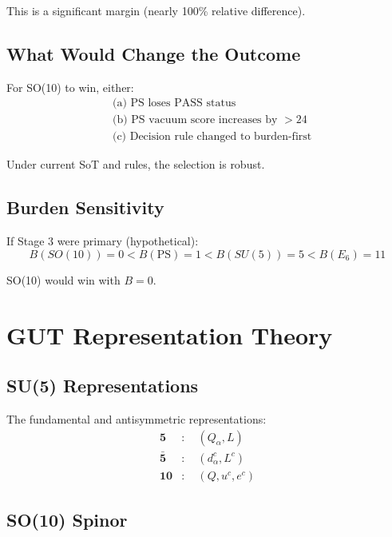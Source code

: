 \documentclass[11pt,a4paper]{article}
\begin{document}
This is a significant margin (nearly 100\% relative difference).

\subsection{What Would Change the Outcome}
\label{app:outcome-change}

For SO(10) to win, either:
\begin{align}
\label{eq:change-1}
&\text{(a) PS loses PASS status} \\
\label{eq:change-2}
&\text{(b) PS vacuum score increases by } > 24 \\
\label{eq:change-3}
&\text{(c) Decision rule changed to burden-first}
\end{align}

Under current SoT and rules, the selection is robust.

\subsection{Burden Sensitivity}
\label{app:burden-sensitivity}

If Stage 3 were primary (hypothetical):
\begin{equation}
\label{eq:burden-rank}
B(SO(10)) = 0 < B(\text{PS}) = 1 < B(SU(5)) = 5 < B(E_6) = 11
\end{equation}

SO(10) would win with $B = 0$.

\section{GUT Representation Theory}
\label{app:gut-reps}

\subsection{SU(5) Representations}
\label{app:su5-reps}

The fundamental and antisymmetric representations:
\begin{align}
\label{eq:su5-5}
\mathbf{5} &: \quad (Q_\alpha, L) \\
\label{eq:su5-5bar}
\bar{\mathbf{5}} &: \quad (d^c_\alpha, L^c) \\
\label{eq:su5-10}
\mathbf{10} &: \quad (Q, u^c, e^c)
\end{align}

\subsection{SO(10) Spinor}
\label{app:so10-spinor}
\end{document}
